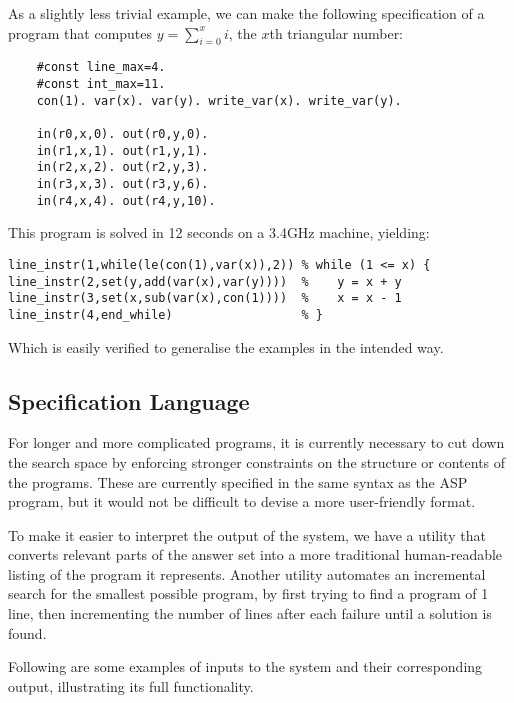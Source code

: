\documentclass[a4paper,twoside,notitlepage]{article}
\begin{document}
As a slightly less trivial example, we can make the following 
specification of a program that computes $y = \sum_{i=0}^x i$, the $x$th 
triangular number:
\begin{verbatim}
    #const line_max=4.
    #const int_max=11. 
    con(1). var(x). var(y). write_var(x). write_var(y).
    
    in(r0,x,0). out(r0,y,0).
    in(r1,x,1). out(r1,y,1).
    in(r2,x,2). out(r2,y,3).
    in(r3,x,3). out(r3,y,6).
    in(r4,x,4). out(r4,y,10).
\end{verbatim}
This program is solved in 12 seconds on a 3.4GHz machine, yielding:
\begin{verbatim}
line_instr(1,while(le(con(1),var(x)),2)) % while (1 <= x) {
line_instr(2,set(y,add(var(x),var(y))))  %    y = x + y
line_instr(3,set(x,sub(var(x),con(1))))  %    x = x - 1
line_instr(4,end_while)                  % }
\end{verbatim}
Which is easily verified to generalise the examples in the intended way.

\subsection{Specification Language} \label{sec:inplng}
For longer and more complicated programs, it is currently necessary to cut 
down the search space by enforcing stronger constraints on the structure 
or contents of the programs. These are currently specified in the same 
syntax as the ASP program, but it would not be difficult to devise a more 
user-friendly format.

To make it easier to interpret the output of the system, we have a utility 
that converts relevant parts of the answer set into a more traditional 
human-readable listing of the program it represents. Another utility 
automates an incremental search for the smallest possible program, by 
first trying to find a program of 1 line, then incrementing the number of 
lines after each failure until a solution is found.

Following are some examples of inputs to the system and their 
corresponding output, illustrating its full functionality.
\end{document}
